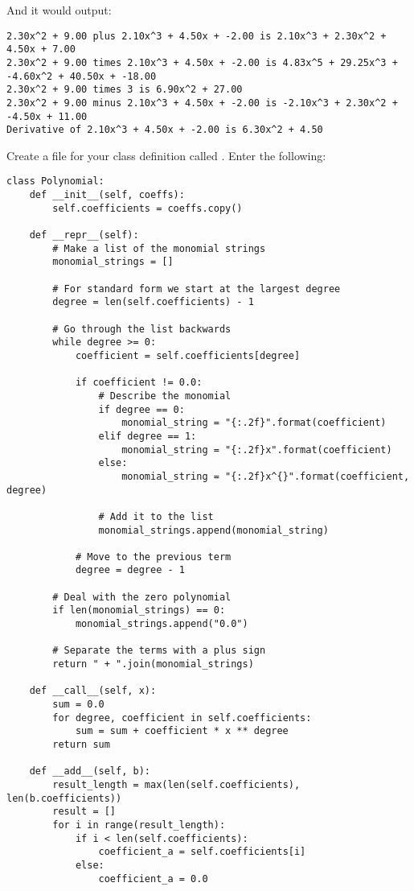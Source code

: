 And it would output:
\begin{Verbatim}
2.30x^2 + 9.00 plus 2.10x^3 + 4.50x + -2.00 is 2.10x^3 + 2.30x^2 + 4.50x + 7.00
2.30x^2 + 9.00 times 2.10x^3 + 4.50x + -2.00 is 4.83x^5 + 29.25x^3 + -4.60x^2 + 40.50x + -18.00
2.30x^2 + 9.00 times 3 is 6.90x^2 + 27.00
2.30x^2 + 9.00 minus 2.10x^3 + 4.50x + -2.00 is -2.10x^3 + 2.30x^2 + -4.50x + 11.00
Derivative of 2.10x^3 + 4.50x + -2.00 is 6.30x^2 + 4.50  
\end{Verbatim}

Create a file for your class definition called . Enter the following:
\begin{Verbatim}
class Polynomial:
    def __init__(self, coeffs):
        self.coefficients = coeffs.copy()

    def __repr__(self):
        # Make a list of the monomial strings
        monomial_strings = []

        # For standard form we start at the largest degree
        degree = len(self.coefficients) - 1

        # Go through the list backwards
        while degree >= 0:
            coefficient = self.coefficients[degree]

            if coefficient != 0.0:
                # Describe the monomial
                if degree == 0:
                    monomial_string = "{:.2f}".format(coefficient)
                elif degree == 1:
                    monomial_string = "{:.2f}x".format(coefficient)
                else:
                    monomial_string = "{:.2f}x^{}".format(coefficient, degree)
                
                # Add it to the list
                monomial_strings.append(monomial_string)
        
            # Move to the previous term
            degree = degree - 1

        # Deal with the zero polynomial
        if len(monomial_strings) == 0:
            monomial_strings.append("0.0")
    
        # Separate the terms with a plus sign
        return " + ".join(monomial_strings)

    def __call__(self, x):
        sum = 0.0  
        for degree, coefficient in self.coefficients:
            sum = sum + coefficient * x ** degree
        return sum

    def __add__(self, b):
        result_length = max(len(self.coefficients), len(b.coefficients))
        result = []
        for i in range(result_length):
            if i < len(self.coefficients):
                coefficient_a = self.coefficients[i]
            else:
                coefficient_a = 0.0


\end{Verbatim}
